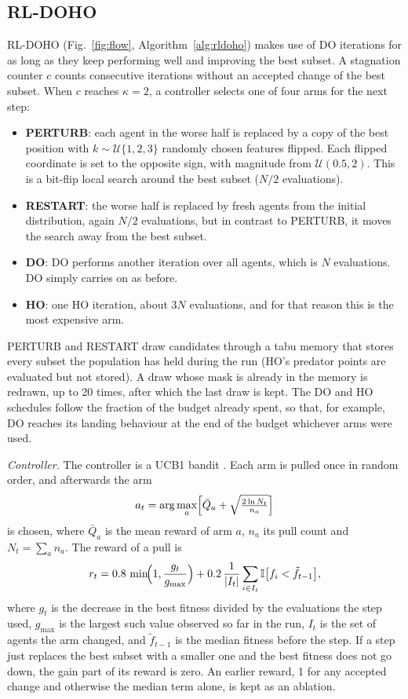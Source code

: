 \documentclass[pdflatex,sn-basic]{sn-jnl}
\begin{document}
\subsection{RL-DOHO}
RL-DOHO (Fig.~\ref{fig:flow}, Algorithm~\ref{alg:rldoho}) makes use of DO iterations for as long as they keep performing well and improving the best subset. A stagnation counter $c$ counts consecutive iterations without an accepted change of the best subset. When $c$ reaches $\kappa=2$, a controller selects one of four arms for the next step:
\begin{itemize}
\item \textbf{PERTURB}: each agent in the worse half is replaced by a copy of the best position with $k\sim\mathcal{U}\{1,2,3\}$ randomly chosen features flipped. Each flipped coordinate is set to the opposite sign, with magnitude from $\mathcal{U}(0.5,2)$. This is a bit-flip local search around the best subset ($N/2$ evaluations).
\item \textbf{RESTART}: the worse half is replaced by fresh agents from the initial distribution, again $N/2$ evaluations, but in contrast to PERTURB, it moves the search away from the best subset.
\item \textbf{DO}: DO performs another iteration over all agents, which is $N$ evaluations. DO simply carries on as before.
\item \textbf{HO}: one HO iteration, about $3N$ evaluations, and for that reason this is the most expensive arm.
\end{itemize}
PERTURB and RESTART draw candidates through a tabu memory that stores every subset the population has held during the run (HO's predator points are evaluated but not stored). A draw whose mask is already in the memory is redrawn, up to 20 times, after which the last draw is kept. The DO and HO schedules follow the fraction of the budget already spent, so that, for example, DO reaches its landing behaviour at the end of the budget whichever arms were used.

\emph{Controller.} The controller is a UCB1 bandit \citep{auer2002}. Each arm is pulled once in random order, and afterwards the arm
\begin{equation}
a_t=\arg\max_a\Bigl[\bar{Q}_a + \sqrt{\tfrac{2\ln N_t}{n_a}}\Bigr]
\end{equation}
is chosen, where $\bar{Q}_a$ is the mean reward of arm $a$, $n_a$ its pull count and $N_t=\sum_a n_a$. The reward of a pull is
\begin{equation}
r_t=0.8\,\min\!\Bigl(1,\frac{g_t}{g_{\max}}\Bigr)+0.2\,\frac{1}{|I_t|}\sum_{i\in I_t}\mathbb{I}\bigl[f_i<\tilde f_{t-1}\bigr],
\label{eq:reward}
\end{equation}
where $g_t$ is the decrease in the best fitness divided by the evaluations the step used, $g_{\max}$ is the largest such value observed so far in the run, $I_t$ is the set of agents the arm changed, and $\tilde f_{t-1}$ is the median fitness before the step. If a step just replaces the best subset with a smaller one and the best fitness does not go down, the gain part of its reward is zero. An earlier reward, 1 for any accepted change and otherwise the median term alone, is kept as an ablation.
\end{document}
